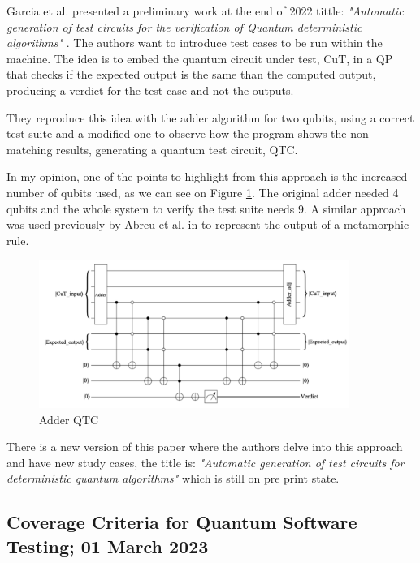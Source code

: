 \begin{itemize}
Garcia et al. presented a preliminary work at the end of 2022 tittle: \textit{"Automatic generation of test circuits for the verification of Quantum deterministic algorithms"} \cite{garcia2022automatic}. The authors want to introduce test cases to be run within the machine. The idea is to embed the quantum circuit under test, CuT, in a QP that checks if the expected output is the same than the computed output, producing a verdict for the test case and not the outputs.\newline

They reproduce this idea with the adder algorithm for two qubits, using a correct test suite and a modified one to observe how the program shows the non matching results, generating a quantum test circuit, QTC.\newline

In my opinion, one of the points to highlight from this approach is the increased number of qubits used, as we can see on Figure \ref{Fig:GarciaAdder}. The original adder needed 4 qubits and the whole system to verify the test suite needs 9. A similar approach was used previously by Abreu et al. in \cite{abreu2022metamorphic} to represent the output of a metamorphic rule.

\begin{figure}[H]
        \centering
        \includegraphics[width=0.9\textwidth]{TFM/photos/GarciaAdder.png}
        \caption{Adder QTC \cite{garcia2022automatic}} 
        \label{Fig:GarciaAdder}
\end{figure}

There is a new version of this paper where the authors delve into this approach and have new study cases, the title is: \textit{"Automatic generation of test circuits for deterministic quantum algorithms"} \cite{garcia4421955automatic} which is still on pre print state.

\vspace{15pt}
\subsection{Coverage Criteria for Quantum Software Testing; 01 March 2023}


\end{itemize}
